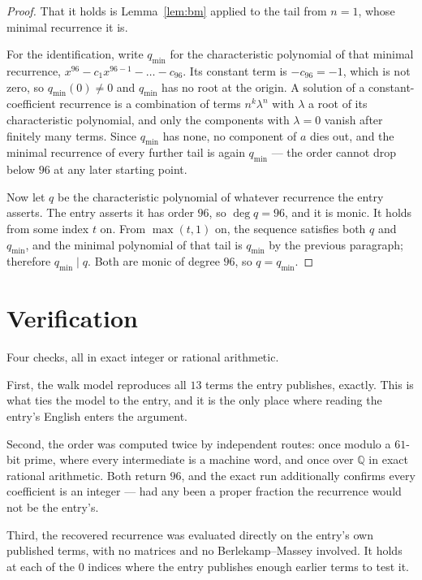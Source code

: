 \documentclass[11pt,a4paper]{article}
\theoremstyle{plain}
\theoremstyle{definition}
\begin{document}
\begin{proof}
That it holds is Lemma~\ref{lem:bm} applied to the tail from $n=1$, whose minimal
recurrence it is.

For the identification, write $q_{\min}$ for the characteristic polynomial of that minimal
recurrence, $x^{96}-c_1x^{96-1}-\dots-c_{96}$. Its constant term is
$-c_{96}=-1$, which is not zero, so $q_{\min}(0)\neq0$ and $q_{\min}$ has no
root at the origin. A solution of a constant-coefficient recurrence is a combination of terms
$n^{k}\lambda^{n}$ with $\lambda$ a root of its characteristic polynomial, and only the
components with $\lambda=0$ vanish after finitely many terms. Since $q_{\min}$ has none, no
component of $a$ dies out, and the minimal recurrence of every further tail is again
$q_{\min}$ --- the order cannot drop below $96$ at any later starting point.

Now let $q$ be the characteristic polynomial of whatever recurrence the entry asserts. The
entry asserts it has order $96$, so $\deg q=96$, and it is monic. It holds from some
index $t$ on. From $\max(t,1)$ on, the sequence satisfies both $q$ and $q_{\min}$, and
the minimal polynomial of that tail is $q_{\min}$ by the previous paragraph; therefore
$q_{\min}\mid q$. Both are monic of degree $96$, so $q=q_{\min}$.
\end{proof}

\section{Verification}

Four checks, all in exact integer or rational arithmetic.

First, the walk model reproduces all $13$ terms the entry publishes, exactly. This is
what ties the model to the entry, and it is the only place where reading the entry's English
enters the argument.

Second, the order was computed twice by independent routes: once modulo a $61$-bit prime, where
every intermediate is a machine word, and once over $\mathbb{Q}$ in exact rational arithmetic.
Both return $96$, and the exact run additionally confirms every coefficient is an integer
--- had any been a proper fraction the recurrence would not be the entry's.

Third, the recovered recurrence was evaluated directly on the entry's own published terms, with
no matrices and no Berlekamp--Massey involved. It holds at each of the $0$ indices where
the entry publishes enough earlier terms to test it.
\end{document}
